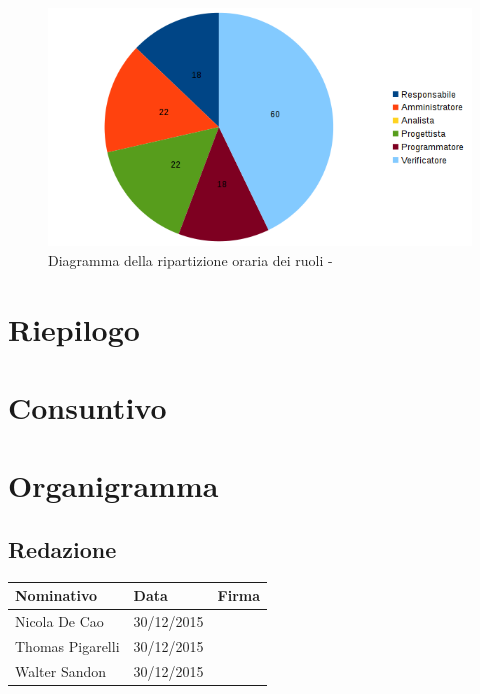 \documentclass[12pt,a4paper]{article}
\begin{document}
\begin{center}
\begin{figure}[H]
\centering
\includegraphics[width=\textwidth]{diagrammaTortaVerificaValidazioneTotaleOre.png}
\caption{Diagramma della ripartizione oraria dei ruoli - \FA}
\end{figure}
\end{center}

\newpage

\section{Riepilogo}

\newpage

\section{Consuntivo}

\newpage

\appendix
\section{Organigramma}

\subsection{Redazione}

\begin{tabular}{| l | l | l |}
    \hline
    Nominativo & Data & Firma \\ \hline
    Nicola De Cao & 30/12/2015 & \\ \hline
    Thomas Pigarelli & 30/12/2015 & \\ \hline
    Walter Sandon & 30/12/2015 & \\ \hline
\end{tabular}
\end{document}
